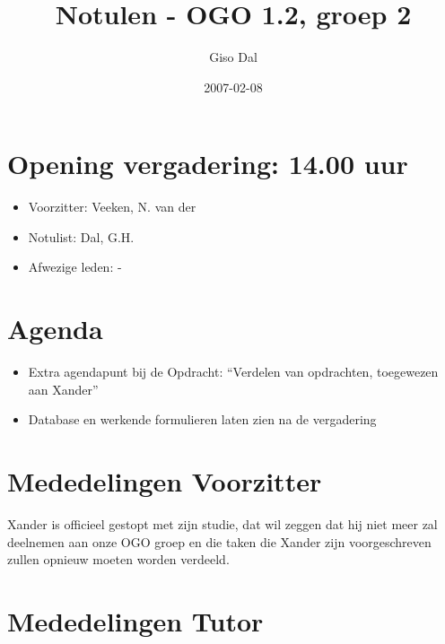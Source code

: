 \documentclass[]{article}
\title{Notulen - OGO 1.2, groep 2}
\author{ Giso Dal \\ }
\date{2007-02-08}
\begin{document}
\ifpdf
{}
\else
{}
\fi

\maketitle


\section{Opening vergadering: 14.00 uur }
  \begin{itemize}
    \item Voorzitter: Veeken, N. van der
    \item Notulist: Dal, G.H.
    \item Afwezige leden: -
  \end{itemize}

\section{Agenda}
  \begin{itemize}
     \item Extra agendapunt bij de Opdracht: ``Verdelen van opdrachten, toegewezen aan Xander''
     \item Database en werkende formulieren laten zien na de vergadering
  \end{itemize}



\section{Mededelingen Voorzitter}
Xander is officieel gestopt met zijn studie, dat wil zeggen dat hij
niet meer zal deelnemen aan onze OGO groep en die taken die Xander
zijn voorgeschreven zullen opnieuw moeten worden verdeeld.

\section{Mededelingen Tutor}
\end{document}

